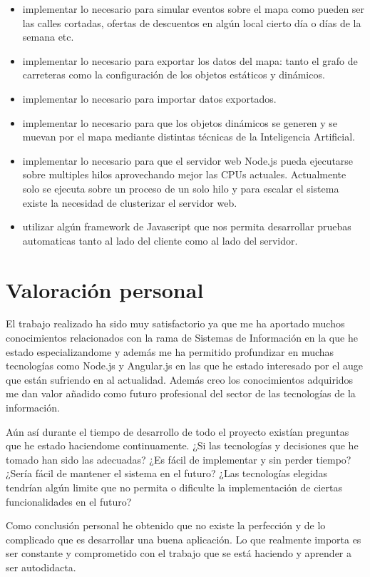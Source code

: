 \begin{itemize}
	\item implementar lo necesario para simular eventos sobre el mapa como pueden ser las calles cortadas, ofertas de descuentos en algún local cierto día o días de la semana etc.
	\item implementar lo necesario para exportar los datos del mapa: tanto el grafo de carreteras como la configuración de los objetos estáticos y dinámicos.
	\item implementar lo necesario para importar datos exportados.
	\item implementar lo necesario para que los objetos dinámicos se generen y se muevan por el mapa mediante distintas técnicas de la Inteligencia Artificial.
	\item implementar lo necesario para que el servidor web Node.js pueda ejecutarse sobre multiples hilos aprovechando mejor las CPUs actuales. Actualmente solo se ejecuta sobre un proceso de un solo hilo y para escalar el sistema existe la necesidad de clusterizar el servidor web.
	\item utilizar algún framework de Javascript que nos permita desarrollar pruebas automaticas tanto al lado del cliente como al lado del servidor.
\end{itemize}

\section{Valoración personal}

El trabajo realizado ha sido muy satisfactorio ya que me ha aportado muchos conocimientos relacionados con la rama de Sistemas de Información en la que he estado especializandome y además me ha permitido profundizar en muchas tecnologías como Node.js y Angular.js en las que he estado interesado por el auge que están sufriendo en al actualidad. Además creo los conocimientos adquiridos me dan valor añadido como futuro profesional del sector de las tecnologías de la información.

Aún así durante el tiempo de desarrollo de todo el proyecto existían preguntas que he estado haciendome continuamente. ¿Si las tecnologías y decisiones que he tomado han sido las adecuadas? ¿Es fácil de implementar y sin perder tiempo? ¿Sería fácil de mantener el sistema en el futuro? ¿Las tecnologías elegidas tendrían algún limite que no permita o dificulte la implementación de ciertas funcionalidades en el futuro? 

Como conclusión personal he obtenido que no existe la perfección y de lo complicado que es desarrollar una buena aplicación. Lo que realmente importa es ser constante y comprometido con el trabajo que se está haciendo y aprender a ser autodidacta.